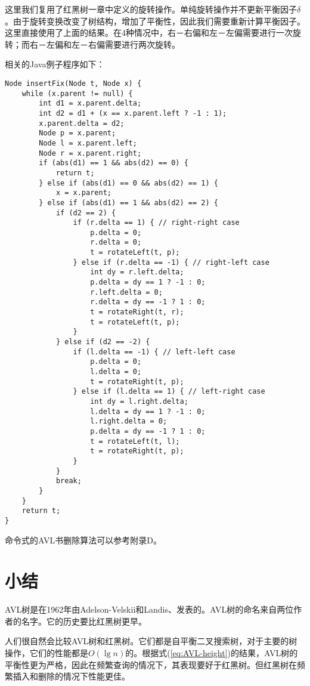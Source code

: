 \documentclass[UTF8]{article}
\begin{document}
这里我们复用了红黑树一章中定义的旋转操作。单纯旋转操作并不更新平衡因子$\delta$。由于旋转变换改变了树结构，增加了平衡性，因此我们需要重新计算平衡因子。这里直接使用了上面的结果。在4种情况中，右－右偏和左－左偏需要进行一次旋转；而右－左偏和左－右偏需要进行两次旋转。

相关的Java例子程序如下：

\begin{lstlisting}
Node insertFix(Node t, Node x) {
    while (x.parent != null) {
        int d1 = x.parent.delta;
        int d2 = d1 + (x == x.parent.left ? -1 : 1);
        x.parent.delta = d2;
        Node p = x.parent;
        Node l = x.parent.left;
        Node r = x.parent.right;
        if (abs(d1) == 1 && abs(d2) == 0) {
            return t;
        } else if (abs(d1) == 0 && abs(d2) == 1) {
            x = x.parent;
        } else if (abs(d1) == 1 && abs(d2) == 2) {
            if (d2 == 2) {
                if (r.delta == 1) { // right-right case
                    p.delta = 0;
                    r.delta = 0;
                    t = rotateLeft(t, p);
                } else if (r.delta == -1) { // right-left case
                    int dy = r.left.delta;
                    p.delta = dy == 1 ? -1 : 0;
                    r.left.delta = 0;
                    r.delta = dy == -1 ? 1 : 0;
                    t = rotateRight(t, r);
                    t = rotateLeft(t, p);
                }
            } else if (d2 == -2) {
                if (l.delta == -1) { // left-left case
                    p.delta = 0;
                    l.delta = 0;
                    t = rotateRight(t, p);
                } else if (l.delta == 1) { // left-right case
                    int dy = l.right.delta;
                    l.delta = dy == 1 ? -1 : 0;
                    l.right.delta = 0;
                    p.delta = dy == -1 ? 1 : 0;
                    t = rotateLeft(t, l);
                    t = rotateRight(t, p);
                }
            }
            break;
        }
    }
    return t;
}
\end{lstlisting}

命令式的AVL书删除算法可以参考附录D。

\section{小结}
AVL树是在1962年由Adelson-Velskii和Landis\cite{wiki-avl}、\cite{TFATP}发表的。AVL树的命名来自两位作者的名字。它的历史要比红黑树更早。

人们很自然会比较AVL树和红黑树。它们都是自平衡二叉搜索树，对于主要的树操作，它们的性能都是$O(\lg n)$的。根据式(\ref{eq:AVL-height})的结果，AVL树的平衡性更为严格，因此在频繁查询的情况下，其表现要好于红黑树\cite{wiki-avl}。但红黑树在频繁插入和删除的情况下性能更佳。
\end{document}
